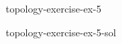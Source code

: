 \documentclass[preview]{standalone}
\begin{document}
\begin{snippetexercise}{topology-exercise-ex-5}{}
    \todo
\end{snippetexercise}

\begin{snippetsolution}{topology-exercise-ex-5-sol}{}
    \todo
\end{snippetsolution}
\end{document}
